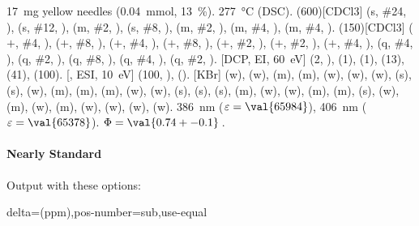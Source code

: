 \documentclass{chemmacros-manual}
\begin{document}
\begin{sourcecode}
  \begin{experimental}[<optionen>]
     \SI{17}{\milli\gram} yellow needles (\SI{0.04}{\milli\mole},
      \SI{13}{\percent}).
     \SI{277}{\celsius} (DSC).
    \NMR(600)[CDCl3]  (s, \#{24}, ),  (s, \#{12},
    ),  (m, \#{2}, ),  (s, \#{8},
    ),  (m, \#{2}, ),  (m, \#{4},
    ),  (m, \#{4}, ).
    (150)[CDCl3]  ($+$, \#{4}, ),  ($+$,
    \#{8}, ),  ($+$, \#{4}, ),  ($+$, \#{8},
    ),  ($+$, \#{2}, ),  ($+$, \#{2},
    ),  ($+$, \#{4}, ),  (q, \#{4},
    ),  (q, \#{2}, ),  (q, \#{8}, ),
     (q, \#{4}, ),  (q, \#{2}, ).
    [DCP, EI, \SI{60}{\electronvolt}]  (2, ), 
    (1),  (1),  (13),  (41),  (100).
    [, ESI, \SI{10}{\electronvolt}]  (100,
    ),  ().
    [KBr]  (w),  (w),  (m), 
    (m),  (w),  (w),  (w),  (s),
     (s),  (w),  (m),  (m), 
    (m),  (w),  (w),  (s),  (s),
     (s),  (m),  (w),  (w), 
    (m),  (m),  (s),  (w),  (m), 
    (w),  (m),  (w),  (w),  (w), 
    (w).
     \SI{386}{\nano\metre} ($\varepsilon = \val{65984}$),
    \SI{406}{\nano\metre} ($\varepsilon = \val{65378}$).
     $\Phi = \val{0.74+-0.1}$\,.
  \end{experimental}
\end{sourcecode}

\paragraph{Nearly Standard}
Output with these options:

\begin{sourcecode}
  delta=(ppm),pos-number=sub,use-equal
\end{sourcecode}
\end{document}
